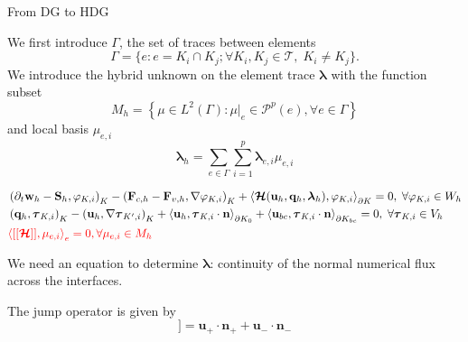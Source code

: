 \documentclass[24pt,t,table, aspectratio=169]{beamer}
\newcommand{\vecu}{\mathbf{u}}
\newcommand{\vecF}{\mathbf{F}}
\newcommand{\vecS}{\mathbf{S}}
\newcommand{\vecq}{\mathbf{q}}
\newcommand{\vecw}{\mathbf{w}}
\newcommand{\vectau}{\boldsymbol{\tau}}
\newcommand{\vecHcal}{\boldsymbol{\mathcal{H}}}
\newcommand{\veclambda}{\boldsymbol{\lambda}}
\newcommand{\tesselation}{\mathcal{T}}
\newcommand{\vecn}{\mathbf{n}}
\begin{document}
\begin{frame}{From DG to HDG}
{We first introduce $\Gamma$, the set of traces between elements
\begin{equation}
    \Gamma = \{e:e = K_i \cap K_j; \forall K_i, K_j \in \tesselation,\; K_i \neq K_j\}.
\end{equation}
We introduce the hybrid unknown on the element trace $\veclambda$ with the function subset
\begin{equation*}
M_h = \left\{\mu \in L^2(\Gamma) : \mu|_e \in \mathcal{P}^p(e), \forall e\in \Gamma\right\}
\end{equation*}
and local basis $\mu_{e,i}$
\begin{equation*}
\veclambda_h = \sum_{e\in\Gamma}\sum_{i=1}^{p} \veclambda_{e,i} \mu_{e,i}
\end{equation*}

}

{
\begin{equation*}
\begin{aligned}
& \left(\partial_t \vecw_{h} - \vecS_{h}, \varphi_{K,i} \right)_{K} - \left(\vecF_{c, {h}} - \vecF_{v, {h}}, \nabla \varphi_{K,i} \right)_{K} + \left\langle \vecHcal(\vecu_h, \vecq_h, \veclambda_h), \varphi_{K,i} \right\rangle_{\partial K} = 0, \; \forall \varphi_{K,i} \in W_h\\
& \left(\vecq_h, \vectau_{K,i}\right)_{K} - \left(\vecu_h, \nabla \vectau_{K',i}\right)_{K} + \left\langle \vecu_h, \vectau_{K,i} \cdot \vecn \right\rangle_{\partial K_0} + \left\langle \vecu_{bc}, \vectau_{K,i} \cdot \vecn \right\rangle_{\partial K_{bc}} = 0,\; \forall \vectau_{K,i} \in V_h\\
& \textcolor{red}{\left\langle[[\vecHcal]], \mu_{e,i} \right\rangle_{e} = 0, \forall \mu_{e,i} \in M_h}
\end{aligned}
\end{equation*}

We need an equation to determine $\veclambda$: continuity of the normal numerical flux across the interfaces.

The jump operator is given by
\begin{equation*}
[[\vecu]] = \vecu_+ \cdot \vecn_+ + \vecu_- \cdot \vecn_-
\end{equation*}

}


\end{frame}
\end{document}
